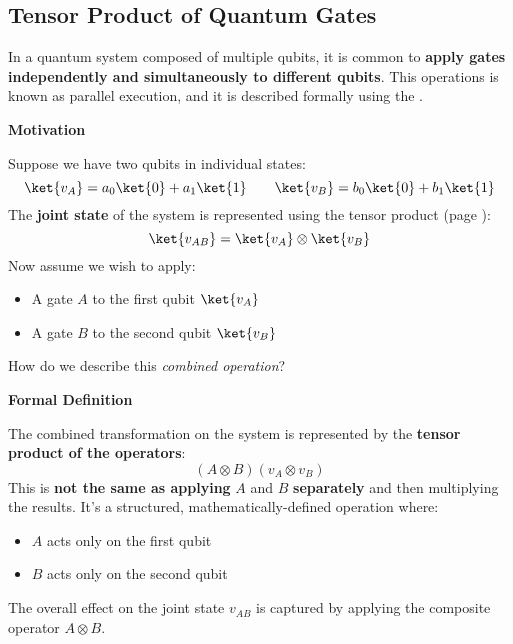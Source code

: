 \subsection{Tensor Product of Quantum Gates}

In a quantum system composed of multiple qubits, it is common to \textbf{apply gates independently and simultaneously to different qubits}. This operations is known as parallel execution, and it is described formally using the .

\highspace
\begin{flushleft}
    \textcolor{Green3}{ \textbf{Motivation}}
\end{flushleft}
Suppose we have two qubits in individual states:
\begin{equation*}
    \ket{v_{A}} = a_{0}\ket{0} + a_{1}\ket{1} \hspace{2em} \ket{v_{B}} = b_{0}\ket{0} + b_{1}\ket{1}
\end{equation*}
The \textbf{joint state} of the system is represented using the tensor product (page \pageref{eq: Tensor Product}):
\begin{equation*}
    \ket{v_{AB}} = \ket{v_{A}} \otimes \ket{v_{B}}
\end{equation*}
Now assume we wish to apply:
\begin{itemize}
    \item A gate $A$ to the first qubit $\ket{v_{A}}$
    \item A gate $B$ to the second qubit $\ket{v_{B}}$
\end{itemize}
How do we describe this \emph{combined operation}?

\highspace
\begin{flushleft}
    \textcolor{Green3}{ \textbf{Formal Definition}}
\end{flushleft}
The combined transformation on the system is represented by the \textbf{tensor product of the operators}:
\begin{equation*}
    \left(A \otimes B\right)\left(v_{A} \otimes v_{B}\right)
\end{equation*}
This is \textbf{not the same as applying} $A$ and $B$ \textbf{separately} and then multiplying the results. It's a structured, mathematically-defined operation where:
\begin{itemize}
    \item $A$ acts only on the first qubit
    \item $B$ acts only on the second qubit
\end{itemize}
The overall effect on the joint state $v_{AB}$ is captured by applying the composite operator $A \otimes B$.

